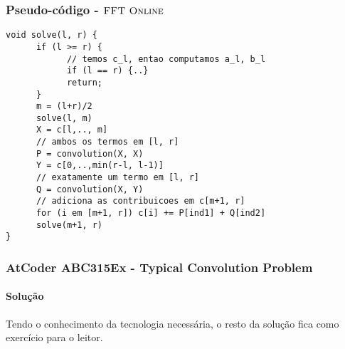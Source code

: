 \begin{frame}[fragile]
\frametitle{Pseudo-código - $\textsc{FFT Online}$}
\begin{lstlisting}
void solve(l, r) {
      if (l >= r) {
            // temos c_l, entao computamos a_l, b_l
            if (l == r) {..} 
            return; 
      }
      m = (l+r)/2
      solve(l, m)
      X = c[l,.., m]
      // ambos os termos em [l, r]
      P = convolution(X, X) 
      Y = c[0,..,min(r-l, l-1)]
      // exatamente um termo em [l, r]
      Q = convolution(X, Y) 
      // adiciona as contribuicoes em c[m+1, r]
      for (i em [m+1, r]) c[i] += P[ind1] + Q[ind2]
      solve(m+1, r)
}

\end{lstlisting}
\end{frame}
\begin{frame}

     \frametitle{AtCoder ABC315Ex - Typical Convolution Problem} %
     \framesubtitle{Solução}
      Tendo o conhecimento da tecnologia necessária, o resto da solução fica como exercício para o leitor.
\end{frame}